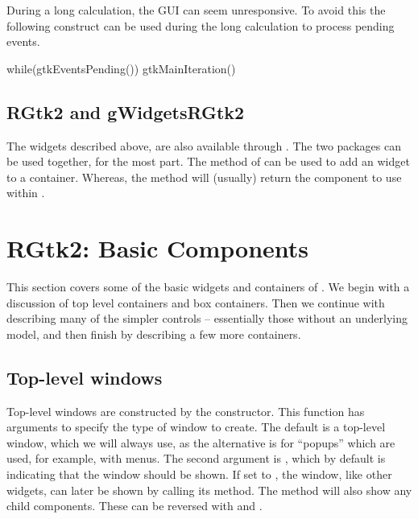 During a long calculation, the GUI can seem unresponsive. To avoid
this the following construct can be used during the long calculation
to process pending events.

\begin{Schunk}
\begin{Sinput}
 while(gtkEventsPending()) 
   gtkMainIteration()
\end{Sinput}
\end{Schunk}



\section{RGtk2 and gWidgetsRGtk2}
\label{sec:RGtk2:gWidgetsRGtk2}


The widgets described above, are also available through
. The two packages can be used together, for the
most part. The  method of  can be used to
add an  widget to a 
container. Whereas, the  method will (usually)
return the  component to use within .


\chapter{RGtk2: Basic Components}
\label{sec:top-level-windows}




This section covers some of the basic widgets and containers of
\GTK. We begin with a discussion of top level containers and box
containers. Then we continue with describing many of the simpler
controls -- essentially those without an underlying model, and then
finish by describing a few more containers. 

\section{Top-level windows}
\label{sec:RGtk2:gtkWindow}

Top-level windows are constructed by the 
constructor. This function has arguments  to specify the
type of window to create. The default is a top-level window, which we
will always use, as the alternative is for ``popups'' which are used,
for example, with menus. The second argument is , which by
default is  indicating that the window should be shown. If
set to , the window, like other widgets, can later be
shown by calling its  method. The
 method will also show any child
components. These can be reversed with  and
.

